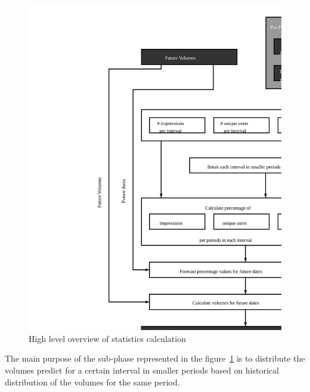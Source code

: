 \begin{figure}[h] \begin{center} \leavevmode
\includegraphics[]{calculate_stats} \caption{ High level overview
of statistics calculation} \label{fig:calculate_stats_ii} \end{center} \end{figure}

The main purpose of the sub-phase represented in the figure~\ref{fig:calculate_stats_ii} is
to distribute the volumes predict for a certain interval in smaller periods
based on historical distribution of the volumes for the same period.

